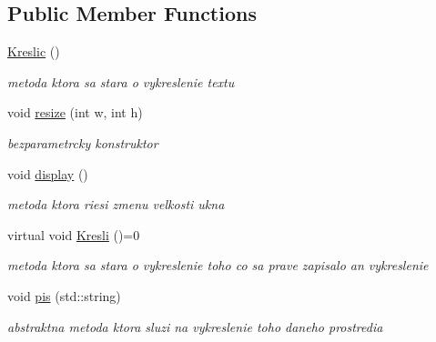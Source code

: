 \subsection*{Public Member Functions}
\begin{DoxyCompactItemize}
\item 
\hypertarget{class_kreslic_ab0f01f44293ef4d5cb0d3b15017cbcd0}{\hyperlink{class_kreslic_ab0f01f44293ef4d5cb0d3b15017cbcd0}{Kreslic} ()}\label{class_kreslic_ab0f01f44293ef4d5cb0d3b15017cbcd0}

\begin{DoxyCompactList}\small\item\em metoda ktora sa stara o vykreslenie textu \end{DoxyCompactList}\item 
\hypertarget{class_kreslic_a11e344af477f3bf2724ff871c6291768}{void \hyperlink{class_kreslic_a11e344af477f3bf2724ff871c6291768}{resize} (int w, int h)}\label{class_kreslic_a11e344af477f3bf2724ff871c6291768}

\begin{DoxyCompactList}\small\item\em bezparametrcky konstruktor \end{DoxyCompactList}\item 
\hypertarget{class_kreslic_ae719429a9a3a3e2a95f7b606ac79d307}{void \hyperlink{class_kreslic_ae719429a9a3a3e2a95f7b606ac79d307}{display} ()}\label{class_kreslic_ae719429a9a3a3e2a95f7b606ac79d307}

\begin{DoxyCompactList}\small\item\em metoda ktora riesi zmenu velkosti ukna \end{DoxyCompactList}\item 
\hypertarget{class_kreslic_a4259d894b56e1c264f3eb5b1db9352f7}{virtual void \hyperlink{class_kreslic_a4259d894b56e1c264f3eb5b1db9352f7}{Kresli} ()=0}\label{class_kreslic_a4259d894b56e1c264f3eb5b1db9352f7}

\begin{DoxyCompactList}\small\item\em metoda ktora sa stara o vykreslenie toho co sa prave zapisalo an vykreslenie \end{DoxyCompactList}\item 
\hypertarget{class_kreslic_aa4c9c244b81ca405fccb2b5d0fa845cd}{void \hyperlink{class_kreslic_aa4c9c244b81ca405fccb2b5d0fa845cd}{pis} (std\-::string)}\label{class_kreslic_aa4c9c244b81ca405fccb2b5d0fa845cd}

\begin{DoxyCompactList}\small\item\em abstraktna metoda ktora sluzi na vykreslenie toho daneho prostredia \end{DoxyCompactList}\end{DoxyCompactItemize}
